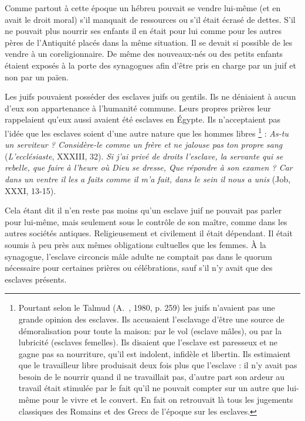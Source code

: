  Comme partout à cette époque un hébreu pouvait se vendre lui-même (et en avait le droit moral) s'il manquait de ressources ou s'il était écrasé de dettes. S'il ne pouvait plus nourrir ses enfants il en était pour lui comme pour les autres pères de l'Antiquité placés dans la même situation. Il se devait si possible de les vendre à un coreligionnaire. De même des nouveaux-nés ou des petits enfants étaient exposés à la porte des synagogues afin d'être pris en charge par un juif et non par un païen. 

 Les juifs pouvaient posséder des esclaves juifs ou gentils. Ils ne déniaient à aucun d'eux son appartenance à l'humanité commune. Leurs propres prières leur rappelaient qu'eux aussi avaient été esclaves en Égypte. Ils n'acceptaient pas l'idée que les esclaves soient d'une autre nature que les hommes libres%
\footnote{Pourtant selon le Talmud (A.~, 1980, p. 259) les juifs n'avaient pas une grande opinion des esclaves. Ils accusaient l'esclavage d'être une source de démoralisation pour toute la maison: par le vol (esclave mâles), ou par la lubricité (esclaves femelles). Ils disaient que l'esclave est paresseux et ne gagne pas sa nourriture, qu'il est indolent, infidèle et libertin. Ils estimaient que le travailleur libre produisait deux fois plus que l'esclave : il n'y avait pas besoin de le nourrir quand il ne travaillait pas, d'autre part son ardeur au travail était stimulée par le fait qu'il ne pouvait compter sur un autre que lui-même pour le vivre et le couvert. En fait on retrouvait là tous les jugements classiques des Romains et des Grecs de l'époque sur les esclaves.}%
 : {\emph{As-tu un serviteur ? Considère-le comme un frère et ne jalouse pas ton propre sang}} (\emph{L'ecclésiaste}, XXXIII, 32). {\emph{Si j'ai privé de droits l'esclave, la servante qui se rebelle, que faire à l'heure où Dieu se dresse, Que répondre à son examen ? Car dans un ventre il les a faits comme il m'a fait, dans le sein il nous a unis}} (Job, XXXI, 13-15). 

 Cela étant dit il n'en reste pas moins qu'un esclave juif ne pouvait pas parler pour lui-même, mais seulement sous le contrôle de son maître, comme dans les autres sociétés antiques. Religieusement et civilement il était dépendant. Il était soumis à peu près aux mêmes obligations cultuelles que les femmes. À la synagogue, l'esclave circoncis mâle adulte ne comptait pas dans le quorum nécessaire pour certaines prières ou célébrations, sauf s'il n'y avait que des esclaves présents.

